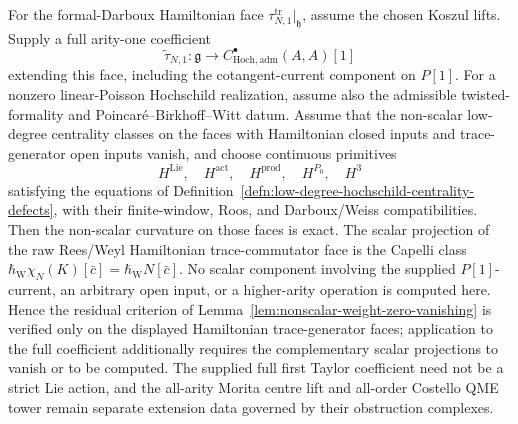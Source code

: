 \begin{prop}\label{prop:residual-vanishes-bf}
For the formal-Darboux Hamiltonian face
\(\tau_{N,1}^{\mathrm{tr}}|_{\mathfrak h}\), assume the chosen Koszul
lifts.  Supply a full arity-one coefficient
\[
  \widetilde\tau_{N,1}\colon
  \mathfrak g\longrightarrow
  C^\bullet_{\mathrm{Hoch},\mathrm{adm}}(A,A)[1]
\]
extending this face, including the cotangent-current component on
\(P[1]\).  For a nonzero linear-Poisson Hochschild realization, assume
also the admissible twisted-formality and
Poincar\'e--Birkhoff--Witt datum.  Assume that the non-scalar
low-degree centrality classes on the faces with Hamiltonian closed
inputs and trace-generator open inputs vanish, and choose
continuous primitives
\[
  H^{\mathrm{Lie}},\quad H^{\mathrm{act}},\quad
  H^{\mathrm{prod}},\quad H^{P_0},\quad H^3
\]
satisfying the equations of
Definition~\ref{defn:low-degree-hochschild-centrality-defects}, with
their finite-window, Roos, and Darboux/Weiss compatibilities.  Then the
non-scalar curvature on those faces is exact.  The scalar projection
of the raw Rees/Weyl Hamiltonian trace-commutator face is the Capelli
class
\(\hbar_{\mathrm{W}}\chi_N(K)[\bar c]
=\hbar_{\mathrm{W}}N[\bar c]\).  No scalar component involving the
supplied \(P[1]\)-current, an arbitrary open input, or a higher-arity
operation is computed here.  Hence the residual criterion of
Lemma~\ref{lem:nonscalar-weight-zero-vanishing} is verified only on the
displayed Hamiltonian trace-generator faces; application to the full
coefficient additionally requires the complementary scalar projections
to vanish or to be computed.  The supplied full first Taylor
coefficient need not be a strict Lie action, and the all-arity Morita
centre lift and all-order Costello QME tower remain separate extension
data governed by their obstruction complexes.
\end{prop}

